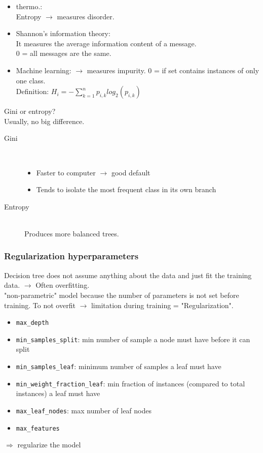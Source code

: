 \begin{itemize}
\item thermo.:\\
Entropy $\rightarrow$ measures disorder.

\item Shannon's information theory:\\
It measures the average information content of a message.\\
0 = all messages are the same.

\item Machine learning: $\rightarrow$ measures impurity.
0 = if set contains instances of only one class.\\
Definition: $H_i = -\sum_{k=1}^n p_{i,k} log_2(p_{i,k})$
\end{itemize}

Gini or entropy?\\
Usually, no big difference.
\begin{description}
    \item [Gini] \hfill\\
    \begin{itemize}
        \item Faster to computer $\rightarrow$ good default\\
        \item Tends to isolate the most frequent class in its own branch
    \end{itemize}
    \item [Entropy] \hfill\\
    Produces more balanced trees.
\end{description}

\subsubsection*{Regularization hyperparameters}
Decision tree does not assume anything about the data and just fit the training data.
$\rightarrow$ Often overfitting.\\

"non-parametric" model because the number of parameters is not set before training.
To not overfit $\rightarrow$ limitation during training = "Regularization".
\begin{itemize}
    \item \verb;max_depth;
    \item \verb;min_samples_split;: min number of sample a node must have before it can split
    \item \verb;min_samples_leaf;: minimum number of samples a leaf must have
    \item \verb;min_weight_fraction_leaf;: min fraction of instances (compared to total instances) a leaf must have
    \item \verb;max_leaf_nodes;: max number of leaf nodes
    \item \verb;max_features;
\end{itemize}
$\Rightarrow$ regularize the model

